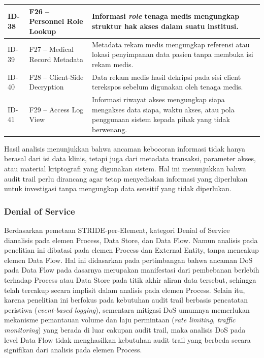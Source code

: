 \begin{xltabular}{\textwidth}{|>{\centering\arraybackslash}p{1.8cm}|>{\raggedright\arraybackslash}p{3.2cm}|X|}
    ID-38 &
    F26 -- Personnel Role Lookup &
    Informasi \textit{role} tenaga medis mengungkap struktur hak akses dalam suatu institusi. \\
    \hline

    ID-39 &
    F27 -- Medical Record Metadata &
    Metadata rekam medis mengungkap referensi atau lokasi penyimpanan data pasien tanpa membuka isi rekam medis. \\
    \hline

    ID-40 &
    F28 -- Client-Side Decryption &
    Data rekam medis hasil dekripsi pada sisi client terekspos sebelum digunakan oleh tenaga medis. \\
    \hline

    ID-41 &
    F29 -- Access Log View &
    Informasi riwayat akses mengungkap siapa mengakses data siapa, waktu akses, atau pola penggunaan sistem kepada pihak yang tidak berwenang. \\
    \hline

\end{xltabular}

Hasil analisis menunjukkan bahwa ancaman kebocoran informasi tidak hanya berasal dari isi data klinis, tetapi juga dari metadata transaksi, parameter akses, atau material kriptografi yang digunakan sistem. Hal ini menunjukkan bahwa audit trail perlu dirancang agar tetap menyediakan informasi yang diperlukan untuk investigasi tanpa mengungkap data sensitif yang tidak diperlukan.

\subsubsection{Denial of Service}

Berdasarkan pemetaan STRIDE-per-Element, kategori Denial of Service dianalisis pada elemen Process, Data Store, dan Data Flow. Namun analisis pada penelitian ini dibatasi pada elemen Process dan External Entity, tanpa mencakup elemen Data Flow. Hal ini didasarkan pada pertimbangan bahwa ancaman DoS pada Data Flow pada dasarnya merupakan manifestasi dari pembebanan berlebih terhadap Process atau Data Store pada titik akhir aliran data tersebut, sehingga telah tercakup secara implisit dalam analisis pada elemen Process. Selain itu, karena penelitian ini berfokus pada kebutuhan audit trail berbasis pencatatan peristiwa (\textit{event-based logging}), sementara mitigasi DoS umumnya memerlukan mekanisme pemantauan volume dan laju permintaan (\textit{rate limiting}, \textit{traffic monitoring}) yang berada di luar cakupan audit trail, maka analisis DoS pada level Data Flow tidak menghasilkan kebutuhan audit trail yang berbeda secara signifikan dari analisis pada elemen Process.

